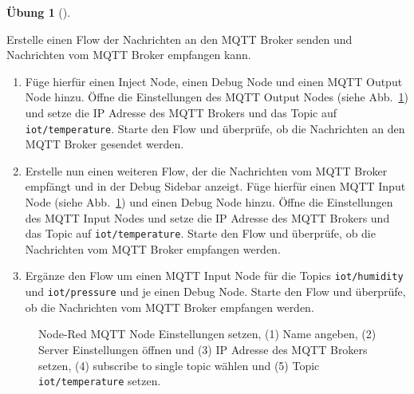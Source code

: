 \documentclass[
  11pt,
  a4paperpaper,
  oneside, openany  ,captions=tableheading
]{scrbook}
\providecommand{\tightlist}{%
  \setlength{\itemsep}{0pt}\setlength{\parskip}{0pt}}
\theoremstyle{definition}
\newtheorem{exercise}{Übung}[chapter]
\theoremstyle{remark}
\begin{document}
\begin{exercise}[]\protect\hypertarget{exr-nodered-flow}{}\label{exr-nodered-flow}

Erstelle einen Flow der Nachrichten an den MQTT Broker senden und
Nachrichten vom MQTT Broker empfangen kann.

\begin{enumerate}
\def\labelenumi{\arabic{enumi}.}
\tightlist
\item
  Füge hierfür einen Inject Node, einen Debug Node und einen MQTT Output
  Node hinzu. Öffne die Einstellungen des MQTT Output Nodes (siehe
  Abb.~\ref{fig-noderedmqttnodesetup}) und setze die IP Adresse des MQTT
  Brokers und das Topic auf \texttt{iot/temperature}. Starte den Flow
  und überprüfe, ob die Nachrichten an den MQTT Broker gesendet werden.
\item
  Erstelle nun einen weiteren Flow, der die Nachrichten vom MQTT Broker
  empfängt und in der Debug Sidebar anzeigt. Füge hierfür einen MQTT
  Input Node (siehe Abb.~\ref{fig-noderedmqttnodesetup}) und einen Debug
  Node hinzu. Öffne die Einstellungen des MQTT Input Nodes und setze die
  IP Adresse des MQTT Brokers und das Topic auf
  \texttt{iot/temperature}. Starte den Flow und überprüfe, ob die
  Nachrichten vom MQTT Broker empfangen werden.
\item
  Ergänze den Flow um einen MQTT Input Node für die Topics
  \texttt{iot/humidity} und \texttt{iot/pressure} und je einen Debug
  Node. Starte den Flow und überprüfe, ob die Nachrichten vom MQTT
  Broker empfangen werden.
\end{enumerate}

\end{exercise}

\begin{figure}


\caption{\label{fig-noderedmqttnodesetup}Node-Red MQTT Node
Einstellungen setzen, (1) Name angeben, (2) Server Einstellungen öffnen
und (3) IP Adresse des MQTT Brokers setzen, (4) subscribe to single
topic wählen und (5) Topic \texttt{iot/temperature} setzen.}

\end{figure}%
\end{document}
